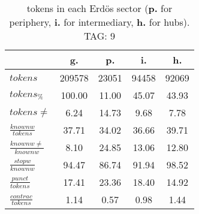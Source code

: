 \begin{table}[h!]
\begin{center}
\begin{tabular}{| l | c | c | c | c |}\hline
 & g. & p. & i. & h. \\\hline
$tokens$ & 209578  & 23051  & 94458  & 92069 \\\hline
$tokens_{\%}$ & 100.00  & 11.00  & 45.07  & 43.93 \\\hline
$tokens \neq$ & 6.24  & 14.73  & 9.68  & 7.78 \\\hline
$\frac{knownw}{tokens}$ & 37.71  & 34.02  & 36.66  & 39.71 \\\hline
$\frac{knownw \neq}{knownw}$ & 8.10  & 24.85  & 13.06  & 12.80 \\\hline
$\frac{stopw}{knownw}$ & 94.47  & 86.74  & 91.94  & 98.52 \\\hline
$\frac{punct}{tokens}$ & 17.41  & 23.36  & 18.40  & 14.92 \\\hline
$\frac{contrac}{tokens}$ & 1.14  & 0.57  & 0.98  & 1.44 \\\hline
\end{tabular}
\caption{tokens in each Erd\"os sector ({{\bf p.}} for periphery, {{\bf i.}} for intermediary, 
    {{\bf h.}} for hubs). TAG: 9}
\end{center}
\end{table}